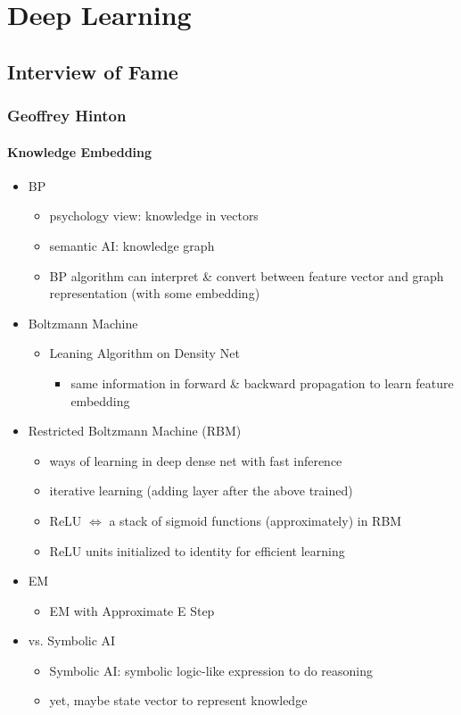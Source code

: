 \chapter{Deep Learning}

\section{Interview of Fame}

\subsection{Geoffrey Hinton}
\subsubsection{Knowledge Embedding}
\begin{itemize}
\item BP
	\begin{itemize}
	\item psychology view: knowledge in vectors
	\item semantic AI: knowledge graph
	\item BP algorithm can interpret \& convert between feature vector and graph representation (with some embedding)
	\end{itemize}
\item Boltzmann Machine
	\begin{itemize}
	\item Leaning Algorithm on Density Net
		\begin{itemize}
		\item same information in forward \& backward propagation to learn feature embedding
		\end{itemize}
	\end{itemize}
\item Restricted Boltzmann Machine (RBM)
	\begin{itemize}
	\item ways of learning in deep dense net with fast inference
	\item iterative learning (adding layer after the above trained)
	\item ReLU $\Leftrightarrow$ a stack of sigmoid functions (approximately) in RBM
	\item ReLU units initialized to identity for efficient learning
	\end{itemize}
\item EM
	\begin{itemize}
	\item EM with Approximate E Step
	\end{itemize}
\item vs. Symbolic AI
	\begin{itemize}
	\item Symbolic AI: symbolic logic-like expression to do reasoning
	\item yet, maybe state vector to represent knowledge
	\end{itemize}
\end{itemize}

